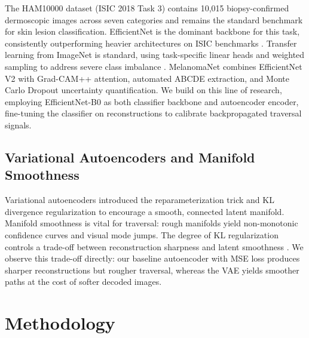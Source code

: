 \documentclass[conference,compsoc]{IEEEtran}
\begin{document}
The HAM10000 dataset \cite{ham10000} (ISIC 2018 Task 3) contains 10,015 biopsy-confirmed dermoscopic images across seven categories and remains the standard benchmark for skin lesion classification. EfficientNet \cite{efficientnet} is the dominant backbone for this task, consistently outperforming heavier architectures on ISIC benchmarks \cite{efficientnet_skin}. Transfer learning from ImageNet is standard, using task-specific linear heads and weighted sampling to address severe class imbalance \cite{ham10000_cls}. MelanomaNet \cite{melanomanet} combines EfficientNet V2 with Grad-CAM++ attention, automated ABCDE extraction, and Monte Carlo Dropout uncertainty quantification. We build on this line of research, employing EfficientNet-B0 as both classifier backbone and autoencoder encoder, fine-tuning the classifier on reconstructions to calibrate backpropagated traversal signals.

\subsection{Variational Autoencoders and Manifold Smoothness}

Variational autoencoders \cite{vae} introduced the reparameterization trick and KL divergence regularization to encourage a smooth, connected latent manifold. Manifold smoothness is vital for traversal: rough manifolds yield non-monotonic confidence curves and visual mode jumps. The degree of KL regularization controls a trade-off between reconstruction sharpness and latent smoothness \cite{vae}. We observe this trade-off directly: our baseline autoencoder with MSE loss produces sharper reconstructions but rougher traversal, whereas the VAE yields smoother paths at the cost of softer decoded images.

\section{Methodology}
\end{document}
